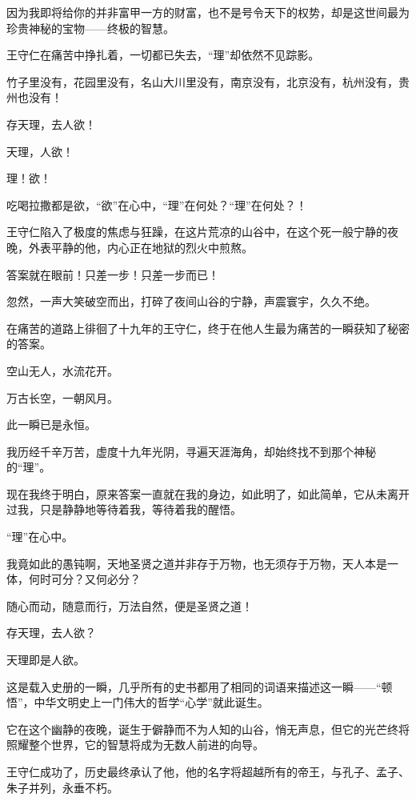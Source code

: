 \begin{multicols}{\theparacolNo}
		因为我即将给你的并非富甲一方的财富，也不是号令天下的权势，却是这世间最为珍贵神秘的宝物——终极的智慧。

		王守仁在痛苦中挣扎着，一切都已失去，“理”却依然不见踪影。

		竹子里没有，花园里没有，名山大川里没有，南京没有，北京没有，杭州没有，贵州也没有！

		存天理，去人欲！

		天理，人欲！

		理！欲！

		吃喝拉撒都是欲，“欲”在心中，“理”在何处？“理”在何处？！

		王守仁陷入了极度的焦虑与狂躁，在这片荒凉的山谷中，在这个死一般宁静的夜晚，外表平静的他，内心正在地狱的烈火中煎熬。

		答案就在眼前！只差一步！只差一步而已！

		忽然，一声大笑破空而出，打碎了夜间山谷的宁静，声震寰宇，久久不绝。

		在痛苦的道路上徘徊了十九年的王守仁，终于在他人生最为痛苦的一瞬获知了秘密的答案。

		空山无人，水流花开。

		万古长空，一朝风月。

		此一瞬已是永恒。

		我历经千辛万苦，虚度十九年光阴，寻遍天涯海角，却始终找不到那个神秘的“理”。

		现在我终于明白，原来答案一直就在我的身边，如此明了，如此简单，它从未离开过我，只是静静地等待着我，等待着我的醒悟。

		“理”在心中。

		我竟如此的愚钝啊，天地圣贤之道并非存于万物，也无须存于万物，天人本是一体，何时可分？又何必分？

		随心而动，随意而行，万法自然，便是圣贤之道！

		存天理，去人欲？

		天理即是人欲。

		这是载入史册的一瞬，几乎所有的史书都用了相同的词语来描述这一瞬——“顿悟”，中华文明史上一门伟大的哲学“心学”就此诞生。

		它在这个幽静的夜晚，诞生于僻静而不为人知的山谷，悄无声息，但它的光芒终将照耀整个世界，它的智慧将成为无数人前进的向导。

		王守仁成功了，历史最终承认了他，他的名字将超越所有的帝王，与孔子、孟子、朱子并列，永垂不朽。
		\ifnum{}
	\end{multicols}
\fi
\newpage
